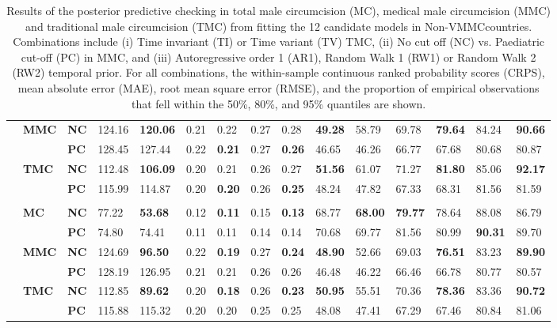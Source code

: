 \documentclass{article}
\begin{document}
\begin{landscape}
{\begin{table}[H]
\begin{tabular}{>{\bfseries}p{0.05cm} p{0.85cm} p{0.75cm} C{1.25cm} C{1.25cm} C{1.25cm} C{1.25cm} C{1.25cm} C{1.25cm} C{1.25cm} C{1.25cm} C{1.25cm} C{1.25cm} C{1.25cm} C{1.25cm}}
  & \bf MMC & \bf NC & 124.16 & \bf120.06 &   0.21 &   0.22 &   0.27 &   0.28 & \bf 49.28 &  58.79 &  69.78 & \bf 79.64 &  84.24 & \bf 90.66 & \\ 
  &  & \bf PC & 128.45 & 127.44 &   0.22 & \bf  0.21 &   0.27 & \bf  0.26 &  46.65 &  46.26 &  66.77 &  67.68 &  80.68 &  80.87 & \\[3pt] 
  & \bf TMC & \bf NC & 112.48 & \bf106.09 &   0.20 &   0.21 &   0.26 &   0.27 & \bf 51.56 &  61.07 &  71.27 & \bf 81.80 &  85.06 & \bf 92.17 & \\ 
  &  & \bf PC & 115.99 & 114.87 &   0.20 & \bf  0.20 &   0.26 & \bf  0.25 &  48.24 &  47.82 &  67.33 &  68.31 &  81.56 &  81.59 & \\[3pt] 
     \\ 
 & \bf MC & \bf NC &  77.22 & \bf 53.68 &   0.12 & \bf  0.11 &   0.15 & \bf  0.13 &  68.77 & \bf 68.00 & \bf 79.77 &  78.64 &  88.08 &  86.79 & \\ 
  &  & \bf PC &  74.80 &  74.41 &   0.11 &   0.11 &   0.14 &   0.14 &  70.68 &  69.77 &  81.56 &  80.99 & \bf 90.31 &  89.70 & \\[3pt] 
  & \bf MMC & \bf NC & 124.69 & \bf 96.50 &   0.22 & \bf  0.19 &   0.27 & \bf  0.24 & \bf 48.90 &  52.66 &  69.03 & \bf 76.51 &  83.23 & \bf 89.90 & \\ 
  &  & \bf PC & 128.19 & 126.95 &   0.21 &   0.21 &   0.26 &   0.26 &  46.48 &  46.22 &  66.46 &  66.78 &  80.77 &  80.57 & \\[3pt] 
  & \bf TMC & \bf NC & 112.85 & \bf 89.62 &   0.20 & \bf  0.18 &   0.26 & \bf  0.23 & \bf 50.95 &  55.51 &  70.36 & \bf 78.36 &  83.36 & \bf 90.72 & \\ 
  &  & \bf PC & 115.88 & 115.32 &   0.20 &   0.20 &   0.25 &   0.25 &  48.08 &  47.41 &  67.29 &  67.46 &  80.84 &  81.06 & \\[3pt] 
  \hline 
  \end{tabular} 
  \caption{Results of the posterior predictive checking in total male 
    circumcision (MC), medical male circumcision (MMC) and traditional male 
    circumcision (TMC) from fitting the 12 candidate models in Non-VMMCcountries. Combinations include (i) Time invariant (TI) or Time variant (TV) TMC, 
    (ii) No cut off (NC) vs. Paediatric cut-off (PC) in MMC, and (iii) 
    Autoregressive order 1 (AR1), Random Walk 1 (RW1) or Random Walk 2 (RW2) 
    temporal prior. For all combinations, the within-sample continuous ranked 
    probability scores (CRPS), mean absolute error (MAE), root mean square 
    error (RMSE), and the proportion of empirical observations that fell within 
    the 50\%, 80\%, and 95\% quantiles are shown.} 
  \label{tab::PPC2Non-VMMC} 
\end{table}} 


\end{landscape}
\end{document}
